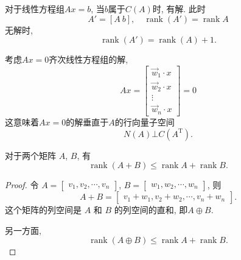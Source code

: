 对于线性方程组$Ax=b$, 当$b$属于$C(A)$时, 有解. 此时
\begin{equation}
  A'= [A\  b], \quad \operatorname{rank}(A')=\operatorname{rank}A
\end{equation}
无解时, 
\begin{equation}
  \operatorname{rank}(A')=\operatorname{rank}(A)+1.
\end{equation}

考虑$Ax=0$齐次线性方程组的解, 
\begin{equation}
  Ax = \begin{bmatrix} 
  \vec{w}_1\cdot x \\ 
  \vec{w}_2\cdot x \\ 
  \vdots \\ 
  \vec{w}_n\cdot x 
  \end{bmatrix}=0
\end{equation}
这意味着$Ax=0$的解垂直于$A$的行向量子空间
\begin{equation}
  N(A)\bot C(A^{\mathrm{T}}).
\end{equation}

\begin{example}
  对于两个矩阵 $A$, $B$, 有
  \begin{equation}
    \operatorname{rank} \left( A + B \right) \le \operatorname{rank} A + \operatorname{rank} B.
  \end{equation}
\end{example}

\begin{proof}
  令 $A = \begin{bmatrix} v_1, v_2, \cdots, v_n \end{bmatrix}$, $B = \begin{bmatrix} w_1, w_2, \cdots, w_n \end{bmatrix}$, 则
  \begin{equation}
      A + B = \begin{bmatrix} v_1 + w_1, v_2 + w_2, \cdots, v_n + w_n \end{bmatrix}.
  \end{equation}
  这个矩阵的列空间是 $A$ 和 $B$ 的列空间的直和, 即$A \oplus B$.
  
  另一方面,
  \begin{equation}
    \operatorname{rank} \left( A \oplus B \right) \le \operatorname{rank} A + \operatorname{rank} B.
  \end{equation}
\end{proof}

